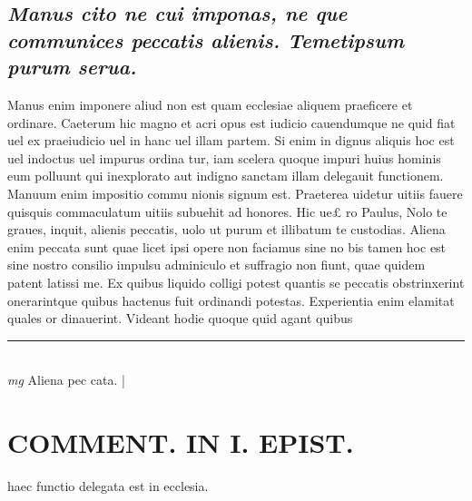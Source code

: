 \documentclass{article}
\begin{document}
\begin{pages}
\subsection*{\textit{Manus cito ne cui imponas, ne que communices peccatis alienis. Temetipsum purum serua. }}\pstart Manus enim imponere aliud non est quam ecclesiae aliquem praeficere et ordinare. Caeterum hic magno et acri opus est iudicio cauendumque ne quid fiat uel ex praeiudicio uel in hanc uel illam partem. Si enim in dignus aliquis hoc est uel indoctus uel impurus ordina tur, iam scelera quoque impuri huius hominis eum polluunt qui inexplorato aut indigno sanctam illam delegauit functionem. Manuum enim impositio commu nionis signum est. Praeterea uidetur uitiis fauere quisquis commaculatum uitiis subuehit ad honores. Hic ue£ ro Paulus, Nolo te graues, inquit, alienis peccatis, uolo ut purum et illibatum te custodias. Aliena enim peccata sunt quae licet ipsi opere non faciamus sine no bis tamen hoc est sine nostro consilio impulsu adminiculo et suffragio non fiunt, quae quidem patent latissi me. Ex quibus liquido colligi potest quantis se peccatis obstrinxerint onerarintque quibus hactenus fuit ordinandi potestas. Experientia enim elamitat quales or dinauerint. Videant hodie quoque quid agant quibus  \pend
\vspace{0.5cm}\noindent
\vspace{0.2cm}\rule{1cm}{0.2pt}\\ 
\hspace{0.2cm}\textit{mg}
\footnotesize Aliena pec cata. 
\normalsize| 
\section*{COMMENT. IN I. EPIST. }\pstart haec functio delegata est in ecclesia.  \pend
{}
{}

\end{pages}
\end{document}
